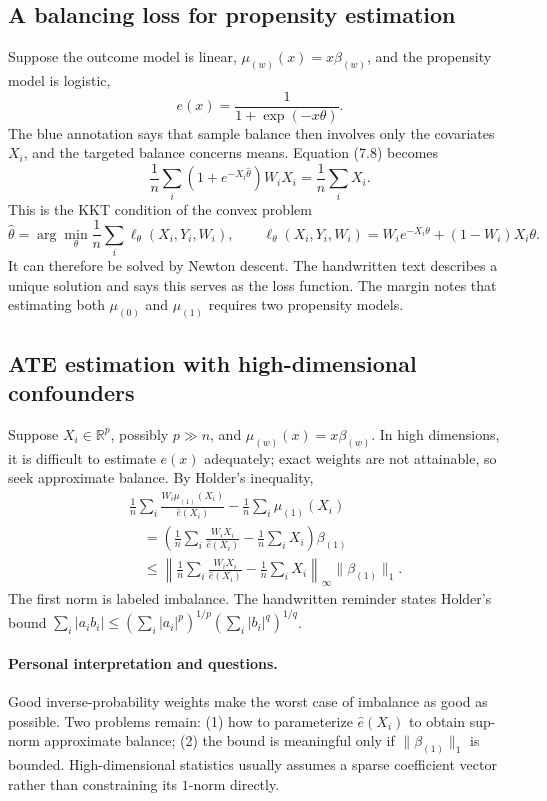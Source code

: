 \subsection{A balancing loss for propensity estimation}
Suppose the outcome model is linear, $\mu_{(w)}(x)=x\beta_{(w)}$, and the propensity model is logistic,
\[
e(x)=\frac1{1+\exp(-x\theta)}.
\]
The blue annotation says that sample balance then involves only the covariates $X_i$, and the targeted balance concerns means. Equation (7.8) becomes
\[
\frac1n\sum_i(1+e^{-X_i\widehat\theta})W_iX_i=\frac1n\sum_iX_i.
\tag{7.9 in the notes}
\]
This is the KKT condition of the convex problem
\[
\widehat\theta=\arg\min_\theta\frac1n\sum_i\ell_\theta(X_i,Y_i,W_i),\qquad
\ell_\theta(X_i,Y_i,W_i)=W_ie^{-X_i\theta}+(1-W_i)X_i\theta.
\tag{7.10 in the notes}
\]
It can therefore be solved by Newton descent. The handwritten text describes a unique solution and says this serves as the loss function. The margin notes that estimating both $\mu_{(0)}$ and $\mu_{(1)}$ requires two propensity models.
\subsection{ATE estimation with high-dimensional confounders}
Suppose $X_i\in\mathbb R^p$, possibly $p\gg n$, and $\mu_{(w)}(x)=x\beta_{(w)}$. In high dimensions, it is difficult to estimate $e(x)$ adequately; exact weights are not attainable, so seek approximate balance. By Holder's inequality,
\begin{align*}
&\frac1n\sum_i\frac{W_i\mu_{(1)}(X_i)}{\widehat e(X_i)}-\frac1n\sum_i\mu_{(1)}(X_i)\\
&\quad=\left(\frac1n\sum_i\frac{W_iX_i}{\widehat e(X_i)}-\frac1n\sum_iX_i\right)\beta_{(1)}\\
&\quad\leq\left\|\frac1n\sum_i\frac{W_iX_i}{\widehat e(X_i)}-\frac1n\sum_iX_i\right\|_\infty\|\beta_{(1)}\|_1.
\end{align*}
The first norm is labeled imbalance. The handwritten reminder states Holder's bound
$\sum_i|a_ib_i|\leq(\sum_i|a_i|^p)^{1/p}(\sum_i|b_i|^q)^{1/q}$.
\paragraph{Personal interpretation and questions.}
Good inverse-probability weights make the worst case of imbalance as good as possible. Two problems remain: (1) how to parameterize $\widehat e(X_i)$ to obtain sup-norm approximate balance; (2) the bound is meaningful only if $\|\beta_{(1)}\|_1$ is bounded. High-dimensional statistics usually assumes a sparse coefficient vector rather than constraining its $1$-norm directly.
